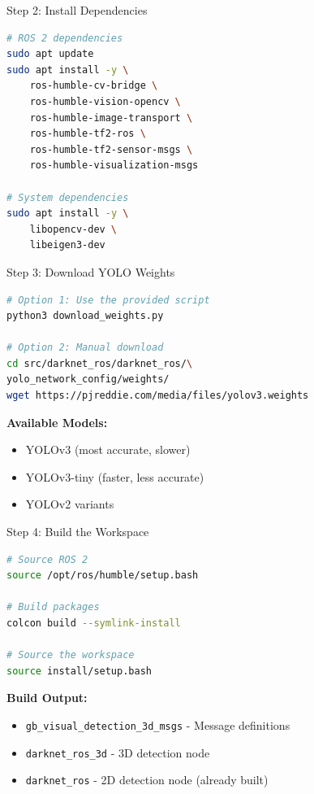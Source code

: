 \documentclass[aspectratio=169]{beamer}
\begin{document}
\begin{frame}[fragile]{Step 2: Install Dependencies}
\begin{lstlisting}[language=bash]
# ROS 2 dependencies
sudo apt update
sudo apt install -y \
    ros-humble-cv-bridge \
    ros-humble-vision-opencv \
    ros-humble-image-transport \
    ros-humble-tf2-ros \
    ros-humble-tf2-sensor-msgs \
    ros-humble-visualization-msgs

# System dependencies
sudo apt install -y \
    libopencv-dev \
    libeigen3-dev
\end{lstlisting}
\end{frame}

\begin{frame}[fragile]{Step 3: Download YOLO Weights}
\begin{lstlisting}[language=bash]
# Option 1: Use the provided script
python3 download_weights.py

# Option 2: Manual download
cd src/darknet_ros/darknet_ros/\
yolo_network_config/weights/
wget https://pjreddie.com/media/files/yolov3.weights
\end{lstlisting}

\vspace{1em}
\textbf{Available Models:}
\begin{itemize}
    \item YOLOv3 (most accurate, slower)
    \item YOLOv3-tiny (faster, less accurate)
    \item YOLOv2 variants
\end{itemize}
\end{frame}

\begin{frame}[fragile]{Step 4: Build the Workspace}
\begin{lstlisting}[language=bash]
# Source ROS 2
source /opt/ros/humble/setup.bash

# Build packages
colcon build --symlink-install

# Source the workspace
source install/setup.bash
\end{lstlisting}

\vspace{1em}
\textbf{Build Output:}
\begin{itemize}
    \item \texttt{gb\_visual\_detection\_3d\_msgs} - Message definitions
    \item \texttt{darknet\_ros\_3d} - 3D detection node
    \item \texttt{darknet\_ros} - 2D detection node (already built)
\end{itemize}
\end{frame}
\end{document}
